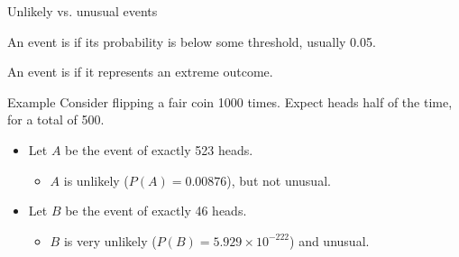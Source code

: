 \documentclass[xcolor=table, aspectratio=169, bigger, handout]{beamer}
\begin{document}
\begin{frame}{Unlikely vs. unusual events}
\begin{block}{}
An event is  if its probability is below some threshold, usually 0.05.
\end{block}

\begin{block}{}
An event is  if it represents an extreme outcome.
\end{block}

\pause

\begin{exampleblock}{Example}
Consider flipping a fair coin 1000 times. Expect heads half of the time, for a total of 500.

\begin{itemize}
\pause
\item Let $A$ be the event of exactly 523 heads.
\begin{itemize}
\pause
\item $A$ is unlikely ($P(A) = 0.00876$), but not unusual.
\end{itemize}

\pause
\item  Let $B$ be the event of exactly 46 heads.
\begin{itemize}
\pause
\item $B$ is very unlikely ($P(B) = 5.929 \times 10^{-222}$) and unusual.
\end{itemize}
\end{itemize}
\end{exampleblock}
\end{frame}
\end{document}
